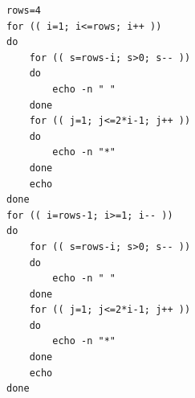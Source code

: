 \begin{verbatim}
rows=4
for (( i=1; i<=rows; i++ ))
do
    for (( s=rows-i; s>0; s-- ))
    do
        echo -n " "
    done
    for (( j=1; j<=2*i-1; j++ ))
    do
        echo -n "*"
    done
    echo
done
for (( i=rows-1; i>=1; i-- ))
do
    for (( s=rows-i; s>0; s-- ))
    do
        echo -n " "
    done
    for (( j=1; j<=2*i-1; j++ ))
    do
        echo -n "*"
    done
    echo
done
\end{verbatim}